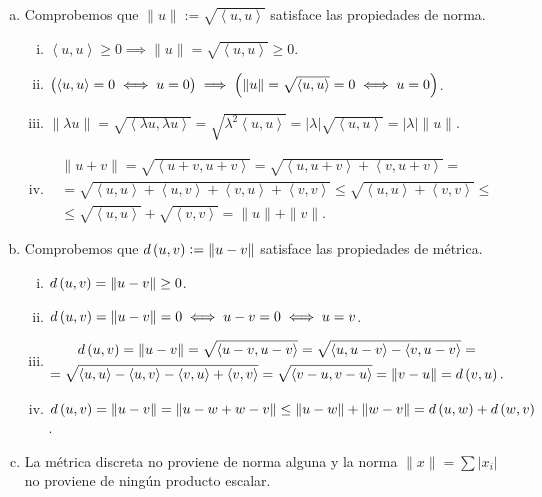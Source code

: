 \begin{eje}
    \begin{enumerate}[(a)]
        \item Comprobemos que $\| u \| := \sqrt{\left< u, u \right>}$ satisface las propiedades de norma.
            \begin{enumerate}[i)]
                \item $\left< u, u \right> \geq 0 \implies \| u \| =  \sqrt{\left< u, u \right> } \geq 0$.
                \item $\left( \left< u, u \right> = 0 \iff u=0 \right) \implies \left( \| u \| = \sqrt{\left< u, u \right> } = 0 \iff u=0 \right)$.
                \item $\| \lambda u \| = \sqrt { \left< \lambda u, \lambda u \right> } = \sqrt {\lambda^2 \left< u, u \right> } = | \lambda | \sqrt { \left<  u,  u \right> } = | \lambda | \| u \|$.
                \item
                \begin{gather*}
                    \| u+v \| =\sqrt { \left< u + v , u+v \right>}=\sqrt { \left< u , u+v \right> + \left< v , u+v \right>}= \\
                    = \sqrt { \left< u , u\right> +\left< u , v \right> + \left< v , u \right> + \left< v , v \right>} \leq \sqrt { \left< u , u\right> + \left< v , v \right>} \leq \\
                    \leq \sqrt { \left< u , u\right>} + \sqrt{ \left< v , v \right>}= \| u \| + \| v \|.
                \end{gather*}
            \end{enumerate}
        \item Comprobemos que $d \left( u, v \right) := \| u - v \|$ satisface las propiedades de métrica.
            \begin{enumerate}[i)]
                \item $d \left( u, v \right) = \|u-v \| \geq 0$.
                \item $d\left( u, v \right) = \| u-v \| = 0 \iff u - v = 0 \iff u = v$.
                \item
                \begin{gather*}
                    d\left( u, v \right) = \| u-v \| = \sqrt { \left< u - v , u-v \right>} = \sqrt { \left< u , u-v \right> - \left< v , u-v \right>} = \\
                    = \sqrt { \left< u , u \right> - \left< u , v \right> - \left< v , u \right> + \left< v , v \right>}  = \sqrt { \left< v - u , v-u \right>} = \| v-u \| = d \left( v, u \right).
                \end{gather*}
                \item $d\left( u, v \right) = \| u -v \| = \| u -w +w -v \| \leq \|u-w \| + \| w-v \|= d \left( u, w \right) + d \left( w, v \right)$.
            \end{enumerate}
        \item La métrica discreta no proviene de norma alguna y la norma $\| x \| = \sum | x_i |$ no proviene de ningún producto escalar.
    \end{enumerate}
\end{eje}

